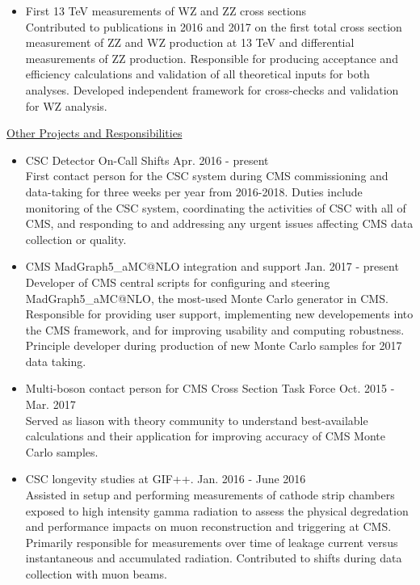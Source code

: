 \documentclass[10pt]{res} %
\begin{document}
\begin{resume}
\begin{itemize}
  \item{First 13 TeV measurements of WZ and ZZ cross sections} \\
    Contributed to publications in 2016 and 2017 on the first total cross section measurement 
    of ZZ and WZ production at 13 TeV and differential measurements of ZZ production. Responsible for producing acceptance
    and efficiency calculations and validation of all theoretical inputs for both analyses. Developed independent framework
    for cross-checks and validation for WZ analysis.

\end{itemize}

\underline{Other Projects and Responsibilities}
\vspace{2mm}
\begin{itemize}
  \item CSC Detector On-Call Shifts \hfill{Apr. 2016 - present} \\
    First contact person for the CSC system during CMS commissioning and data-taking for three weeks per year
    from 2016-2018. Duties include monitoring of the CSC system, coordinating the activities of CSC with all of CMS, and responding to 
    and addressing any urgent issues affecting CMS data collection or quality.

  \item CMS MadGraph5\_aMC@NLO integration and support \hfill{Jan. 2017 - present} \\
    Developer of CMS central scripts
    for configuring and steering MadGraph5\_aMC@NLO, the most-used Monte Carlo generator in CMS. Responsible for 
    providing user support, implementing new 
    developements into the CMS framework, and for improving usability and computing robustness. Principle developer during production
    of new Monte Carlo samples for 2017 data taking.

  \item Multi-boson contact person for CMS Cross Section Task Force \hfill{Oct. 2015 - Mar. 2017} \\
    Served as liason with theory community to understand best-available calculations and 
    their application for improving accuracy of CMS Monte Carlo samples. 

  \item CSC longevity studies at GIF++. \hfill{Jan. 2016 - June 2016} \\
    Assisted in setup and performing measurements
    of cathode strip chambers exposed to high intensity gamma radiation to assess the physical degredation and performance
    impacts on muon reconstruction and triggering at CMS. Primarily responsible for measurements over time of leakage current
    versus instantaneous and accumulated radiation. Contributed to shifts during data collection with muon beams.
\end{itemize}


\end{resume}
\end{document}
